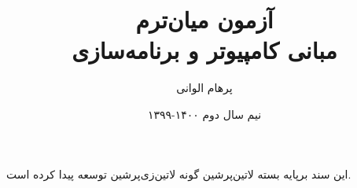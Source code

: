 \documentclass[]{article}
\title{آزمون میان‌ترم\\مبانی کامپیوتر و برنامه‌سازی}
\author{پرهام الوانی}
\date{نیم سال دوم ۱۴۰۰-۱۳۹۹}
\begin{document}
    \maketitle
    \tableofcontents

    
    \vspace*{\fill}
    \begin{center}
این سند برپایه بسته ‌لاتین{‌پرشین} گونه ‌لاتین{‌زی‌پرشین} توسعه پیدا کرده است.
    \end{center}
\end{document}
